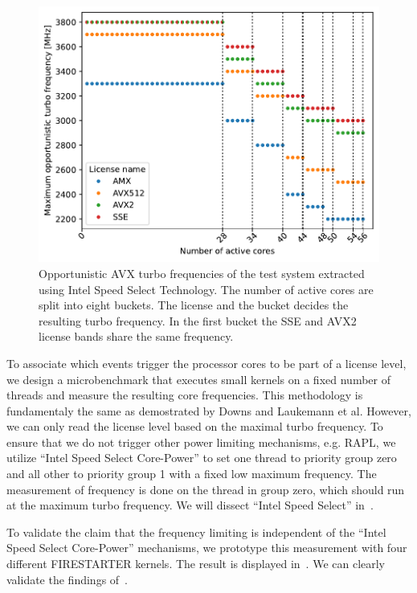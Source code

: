 \begin{figure}[]
    \centering
    \includegraphics[width=0.8\columnwidth]{fig/avx-frequency-license-bands.pdf}
    \caption{\label{fig:p0n-frequencies}Opportunistic AVX turbo frequencies of the test system extracted using Intel Speed Select Technology.
    The number of active cores are split into eight buckets. The license and the bucket decides the resulting turbo frequency.
    In the first bucket the SSE and AVX2 license bands share the same frequency.}
\end{figure}


To associate which events trigger the processor cores to be part of a license level, we design a microbenchmark that executes small kernels on a fixed number of threads and measure the resulting core frequencies.
This methodology is fundamentaly the same as demostrated by Downs and Laukemann et al.
However, we can only read the license level based on the maximal turbo frequency.
To ensure that we do not trigger other power limiting mechanisms, e.g. RAPL, we utilize ``Intel Speed Select Core-Power'' to set one thread to priority group zero and all other to priority group 1 with a fixed low maximum frequency.
The measurement of frequency is done on the thread in group zero, which should run at the maximum turbo frequency.
We will dissect ``Intel Speed Select'' in~.

To validate the claim that the frequency limiting is independent of the ``Intel Speed Select Core-Power'' mechanisms, we prototype this measurement with four different FIRESTARTER kernels.
The result is displayed in~. We can clearly validate the findings of~.

